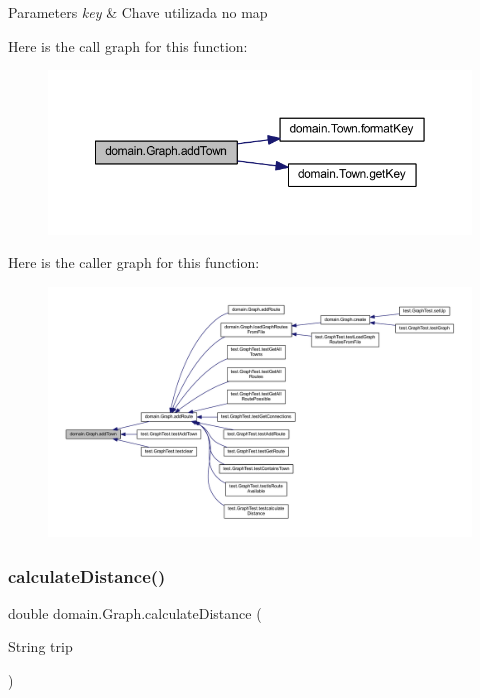 \begin{DoxyParams}{Parameters}
{\em key} & Chave utilizada no map \\
\hline
\end{DoxyParams}
Here is the call graph for this function\+:\nopagebreak
\begin{figure}[H]
\begin{center}
\leavevmode
\includegraphics[width=350pt]{classdomain_1_1_graph_a93f040b758a5f920d195f2fbfdccc741_cgraph}
\end{center}
\end{figure}
Here is the caller graph for this function\+:\nopagebreak
\begin{figure}[H]
\begin{center}
\leavevmode
\includegraphics[width=350pt]{classdomain_1_1_graph_a93f040b758a5f920d195f2fbfdccc741_icgraph}
\end{center}
\end{figure}
\mbox{\label{classdomain_1_1_graph_a7b7f2784b1c0ab3ab14ce6c271659913}} 
\subsubsection{\texorpdfstring{calculate\+Distance()}{calculateDistance()}}
{\footnotesize\ttfamily double domain.\+Graph.\+calculate\+Distance (\begin{DoxyParamCaption}\item[{String}]{trip }\end{DoxyParamCaption})}

